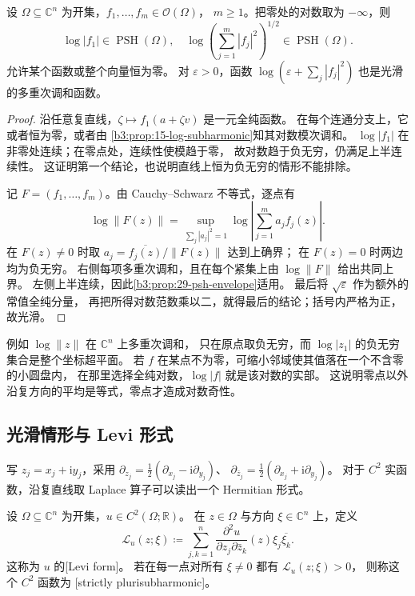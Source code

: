 \begin{proposition}[全纯函数及向量的对数模]\label{b3:prop:29-log-holomorphic-psh}
设 \(\Omega\subseteq\mathbb C^n\) 为开集，\(f_1,\ldots,f_m\in\mathcal O(\Omega)\)，
\(m\ge1\)。把零处的对数取为 \(-\infty\)，则
\[
 \log|f_1|\in\operatorname{PSH}(\Omega),\quad
 \log\left(\sum_{j=1}^m|f_j|^2\right)^{1/2}
       \in\operatorname{PSH}(\Omega).
\]
允许某个函数或整个向量恒为零。
对 \(\varepsilon>0\)，函数
\(\log(\varepsilon+\sum_j|f_j|^2)\) 也是光滑的多重次调和函数。
\end{proposition}
\begin{proof}
沿任意复直线，\(\zeta\mapsto f_1(a+\zeta v)\) 是一元全纯函数。
在每个连通分支上，它或者恒为零，或者由
\cref{b3:prop:15-log-subharmonic}知其对数模次调和。
\(\log|f_1|\) 在非零处连续；在零点处，连续性使模趋于零，
故对数趋于负无穷，仍满足上半连续性。
这证明第一个结论，也说明直线上恒为负无穷的情形不能排除。

记 \(F=(f_1,\ldots,f_m)\)。由 Cauchy--Schwarz 不等式，逐点有
\[
 \log\|F(z)\|
 =\sup_{\sum_j|a_j|^2=1}\log\left|\sum_{j=1}^m a_j f_j(z)\right|.
\]
在 \(F(z)\ne0\) 时取 \(a_j=\overline{f_j(z)}/\|F(z)\|\) 达到上确界；
在 \(F(z)=0\) 时两边均为负无穷。
右侧每项多重次调和，且在每个紧集上由 \(\log\|F\|\) 给出共同上界。
左侧上半连续，因此\cref{b3:prop:29-psh-envelope}适用。
最后将 \(\sqrt\varepsilon\) 作为额外的常值全纯分量，
再把所得对数范数乘以二，就得最后的结论；括号内严格为正，故光滑。
\end{proof}

例如 \(\log\|z\|\) 在 \(\mathbb C^n\) 上多重次调和，
只在原点取负无穷，而 \(\log|z_1|\) 的负无穷集合是整个坐标超平面。
若 \(f\) 在某点不为零，可缩小邻域使其值落在一个不含零的小圆盘内，
在那里选择全纯对数，\(\log|f|\) 就是该对数的实部。
这说明零点以外沿复方向的平均是等式，零点才造成对数奇性。

\subsection{光滑情形与 Levi 形式}
\label{b3:subsec:290304}

写 \(z_j=x_j+\mathrm i y_j\)，采用
\(\partial_{z_j}=\tfrac12(\partial_{x_j}-\mathrm i\partial_{y_j})\)、
\(\partial_{\bar z_j}=\tfrac12(\partial_{x_j}+\mathrm i\partial_{y_j})\)。
对于 \(C^2\) 实函数，沿复直线取 Laplace 算子可以读出一个 Hermitian 形式。

\begin{definition}\label{b3:def:29-levi-form}
设 \(\Omega\subseteq\mathbb C^n\) 为开集，\(u\in C^2(\Omega;\mathbb R)\)。
在 \(z\in\Omega\) 与方向 \(\xi\in\mathbb C^n\) 上，定义
\[
 \mathcal L_u(z;\xi)\coloneqq
 \sum_{j,k=1}^n
 \frac{\partial^2u}{\partial z_j\partial\bar z_k}(z)
       \xi_j\overline{\xi_k}.
\]
这称为 \(u\) 的[Levi form]。
若在每一点对所有 \(\xi\ne0\) 都有 \(\mathcal L_u(z;\xi)>0\)，
则称这个 \(C^2\) 函数为
[strictly plurisubharmonic]。
\end{definition}

